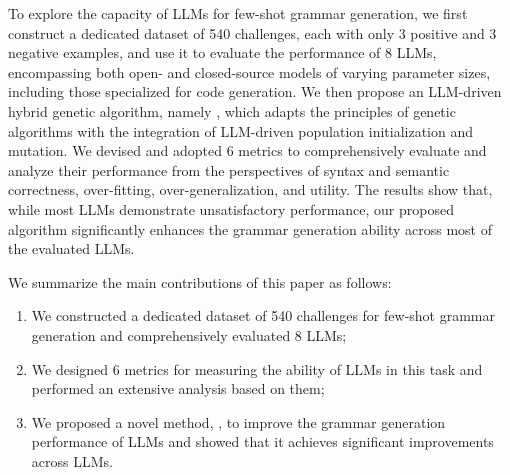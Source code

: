 To explore the capacity of LLMs for few-shot grammar generation, we first construct a dedicated dataset of 540 challenges, each with only 3 positive and 3 negative examples, and use it to evaluate the performance of 8 LLMs, encompassing both open- and closed-source models of varying parameter sizes, including those specialized for code generation. We then propose an LLM-driven hybrid genetic algorithm, namely \NAME, which adapts the principles of genetic algorithms with the integration of LLM-driven population initialization and mutation. We devised and adopted 6 metrics to comprehensively evaluate and analyze their performance from the perspectives of syntax and semantic correctness, over-fitting, over-generalization, and utility. The results show that, while most LLMs demonstrate unsatisfactory performance, our proposed algorithm significantly enhances the grammar generation ability across most of the evaluated LLMs.

We summarize the main contributions of this paper as follows:
\begin{enumerate}
    \item We constructed a dedicated dataset of 540 challenges for few-shot grammar generation and comprehensively evaluated 8 LLMs;
    \item We designed 6 metrics for measuring the ability of LLMs in this task and performed an extensive analysis based on them; 
    \item We proposed a novel method, \NAME, to improve the grammar generation performance of LLMs and showed that it achieves significant improvements across LLMs.
\end{enumerate}
